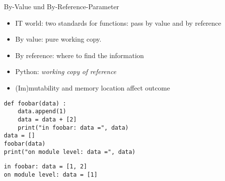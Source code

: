 
\begin{frame}[fragile]{By-Value und By-Reference-Parameter}
%
\begin{itemize}
\item IT world: two standards for functions: pass by value and by reference
\item By value: pure working copy.
\item By reference: where to find the information
\item Python: \emph{working copy of reference}
\item (Im)mutability and memory location affect outcome
\end{itemize}
%
\begin{tcbraster}[raster columns=2,
                  raster equal height,
                  nobeforeafter,
                  raster column skip=0.5cm]
\begin{codebox}
\begin{verbatim}
def foobar(data) :
    data.append(1)
    data = data + [2]
    print("in foobar: data =", data)
data = []
foobar(data)
print("on module level: data =", data)
\end{verbatim}
\end{codebox}
%
\begin{cmdbox}
\begin{verbatim}
in foobar: data = [1, 2]
on module level: data = [1]
\end{verbatim}
\end{cmdbox}
\end{tcbraster}
%
\end{frame}


